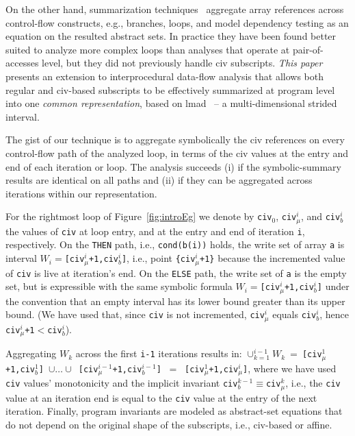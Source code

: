 \documentclass{sig-alternate}
\begin{document}
On the other hand, summarization techniques~\cite{SUIF,LMAD,CosPLDI} aggregate 
array references across control-flow constructs, e.g., branches, loops, and  
model dependency testing as an equation on the resulted abstract sets. 
In practice they have been found better suited to analyze more complex loops 
than analyses that operate at pair-of-accesses level, but they 
did not previously handle {\sc civ} subscripts.   
%
{\em This paper} presents an extension to interprocedural 
data-flow analysis that allows both regular and {\sc civ}-based subscripts 
to be effectively summarized at program level into one {\em common representation},
based on {\sc lmad}~\cite{LMAD} -- a multi-dimensional strided interval.

The gist of our technique is to aggregate symbolically the {\sc civ} 
references on every control-flow path of the analyzed loop, in terms
of the {\sc civ} values at the entry and end of each iteration or loop.
The analysis succeeds (i) if the symbolic-summary results are identical 
on all paths and (ii) if they can be aggregated across iterations %
within our representation.  

For the rightmost loop of Figure~\ref{fig:introEg} we denote by {\tt civ$_0$}, 
{\tt civ$_\mu^i$}, and {\tt civ$_b^i$} the values of {\tt civ} at loop entry, 
and at the entry and end of iteration {\tt i}, respectively.
%
On the {\tt THEN} path, i.e., {\tt cond(b(i))} holds, the write set 
of array {\tt a} is interval $W_i=${\tt [civ$_\mu^i$+1,civ$_b^i$]}, i.e., point
{\tt \{civ$_\mu^i$+1\}} because the incremented value of {\tt civ} is live 
at iteration's end. On the {\tt ELSE}
path, the write set of {\tt a} is the empty set, but is expressible with the same 
symbolic formula $W_i=${\tt [civ$_\mu^i$+1,civ$_b^i$]} under the convention 
that an empty interval has its lower bound greater than its upper bound. 
(We have used that, since {\tt civ} is not incremented, {\tt civ$_\mu^i$} 
equals {\tt civ$_b^i$}, hence {\tt civ$_\mu^i$+1$ < $civ$_b^i$}).

Aggregating $W_k$ across the first {\tt i-1} iterations results in:
$\cup_{k=1}^{i-1}W_k \ = \ ${\tt [civ$_\mu^1$+1,civ$_b^1$]~$\cup\ldots\cup$~[civ$_\mu^{i-1}$+1,civ$_b^{i-1}$]} $\ = \ $ {\tt [civ$_\mu^1$+1,civ$_\mu^i$]}, where we have used {\tt civ} values'
monotonicity and the implicit invariant {\tt civ$_b^{k-1}\equiv$civ$_\mu^{k}$},
i.e., the {\tt civ} value at an iteration end is equal to the {\tt civ}
value at the entry of the next iteration. 
%
%
Finally, program invariants are modeled as abstract-set equations
that do not depend on the original shape of the subscripts, i.e., 
{\sc civ}-based or affine. 
\end{document}
